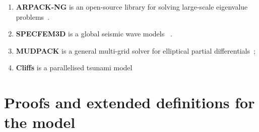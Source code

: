 \begin{enumerate}
\item \textbf{ARPACK-NG} is an open-source library for solving large-scale
eigenvalue problems~\cite{arpackng}.

\item \textbf{SPECFEM3D} is a global seismic wave models
  ~\cite{specfem3d}.

\item \textbf{MUDPACK} is a general multi-grid solver for elliptical
partial differentials~\cite{MUD};

\item \textbf{Cliffs} is a parallelised tsunami
  model~\cite{tolkova2014land}
\end{enumerate}


\section{Proofs and extended definitions for the model}
\label{sec:proofs}


